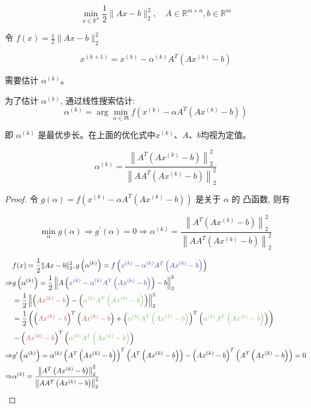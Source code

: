 \begin{problem}
    $$
    \min _{x \in \mathbb{R}^{n}} \frac{1}{2}\|A x-b\|_{2}^{2}, \quad A \in \mathbb{R}^{m \times n}, b \in \mathbb{R}^{m}
    $$
    
    令 $ f(x)=\frac{1}{2}\|A x-b\|_{2}^{2} $

    $$ x^{(k+1)}=x^{(k)}-\alpha^{(k)} A^{T}\left(A x^{(k)}-b\right) $$

    需要估计 $ \alpha^{(k)} $。
\end{problem}

为了估计 $ \alpha^{(k)} $, 通过线性搜索估计:
$$
\alpha^{(k)}=\arg \min _{\alpha \in \Re} f\left(x^{(k)}-\alpha A^{T}\left(A x^{(k)}-b\right)\right)
$$

即 $ \alpha^{(k)} $ 是最优步长。在上面的优化式中$x^{(k)}$、$A$、$b$均视为定值。

\begin{theorem}[线性搜索估计的最优步长]
    $$\alpha^{(k)}=\frac{\left\|A^{T}\left(A x^{(k)}-b\right)\right\|_{2}^{2}}{\left\|A A^{T}\left(A x^{(k)}-b\right)\right\|_{2}^{2}}$$
\end{theorem}

\begin{proof}
    令 $ g(\alpha)=f\left(x^{(k)}-\alpha A^{T}\left(A x^{(k)}-b\right)\right) $ 是关于 $ \alpha $ 的 凸函数, 则有

$$
\min _{\alpha} g(\alpha) \Rightarrow g^{\prime}(\alpha)=0 \Rightarrow \alpha^{(k)}=\frac{\left\|A^{T}\left(A x^{(k)}-b\right)\right\|_{2}^{2}}{\left\|A A^{T}\left(A x^{(k)}-b\right)\right\|_{2}^{2}}
$$


$$\begin{aligned}
    & f(x)=\frac{1}{2}\|A x-b\|_{2}^{2}, g\left(\alpha^{(k)}\right)=f\left({\color{ocre} x^{(k)}-\alpha^{(k)} A^{T}\left(A x^{(k)}-b\right)} \right) \\
    \Rightarrow & g\left(\alpha^{(k)}\right)=\frac{1}{2}\left\|A\left({\color{ocre} x^{(k)}-\alpha^{(k)} A^{T}\left(A x^{(k)}-b\right)} \right)-b\right\|_{2}^{2} \\
    &=\frac{1}{2}\left\|\left({\color{coral} A x^{(k)}-b} \right)-\left({\color{grass} \alpha^{(k)} A^{T}\left(A x^{(k)}-b\right)} \right)\right\|_{2}^{2} \\
    &=\frac{1}{2}\left(\left({\color{coral} A x^{(k)}-b} \right)^{T}\left({\color{coral} A x^{(k)}-b} \right)+\left({\color{grass} \alpha^{(k)} A^{T}\left(A x^{(k)}-b\right)} \right)^{T}\left({\color{grass} \alpha^{(k)} A^{T}\left(A x^{(k)}-b\right)} \right)\right) \\
    &-\left({\color{coral} A x^{(k)}-b} \right)^{T}\left({\color{grass} \alpha^{(k)} A^{T}\left(A x^{(k)}-b\right)} \right) \\
    \Rightarrow & g^{\prime}\left(\alpha^{(k)}\right)=\alpha^{(k)}\left(A^{T}\left(A x^{(k)}-b\right)\right)^{T}\left(A^{T}\left(A x^{(k)}-b\right)\right)-\left(A x^{(k)}-b\right)^{T}\left(A^{T}\left(A x^{(k)}-b\right)\right)=0 \\
    \Rightarrow &\alpha^{(k)}=\frac{\left\|A^{T}\left(A x^{(k)}-b\right)\right\|_{2}^{2}}{\left\|A A^{T}\left(A x^{(k)}-b\right)\right\|_{2}^{2}}
    \end{aligned}$$

\end{proof}


